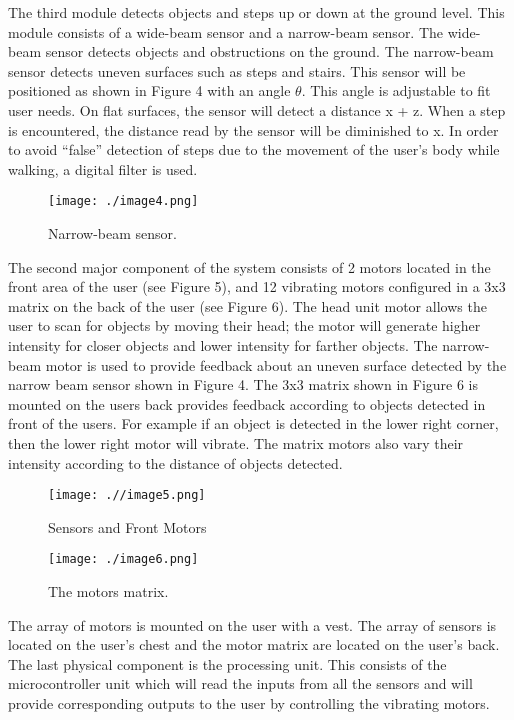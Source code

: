 The third module detects objects and steps up or down at the ground
level. This module consists of a wide-beam sensor and a narrow-beam
sensor. The wide-beam sensor detects objects and obstructions on the
ground. The narrow-beam sensor detects uneven surfaces such as steps and
stairs. This sensor will be positioned as shown in Figure 4 with an
angle $\theta$. This angle is adjustable to fit user needs. On flat surfaces,
the sensor will detect a distance x + z. When a step is encountered, the
distance read by the sensor will be diminished to x. In order to avoid
``false'' detection of steps due to the movement of the user's body
while walking, a digital filter is used.

\begin{figure}
\texttt{[image: ./image4.png]}
\caption{Narrow-beam sensor.}
\label{figure:caseStudyNarrowBeam}
\end{figure}


The second major component of the system consists of 2 motors located in
the front area of the user (see Figure 5), and 12 vibrating motors
configured in a 3x3 matrix on the back of the user (see Figure 6). The
head unit motor allows the user to scan for objects by moving their
head; the motor will generate higher intensity for closer objects and
lower intensity for farther objects. The narrow-beam motor is used to
provide feedback about an uneven surface detected by the narrow beam
sensor shown in Figure 4. The 3x3 matrix shown in Figure 6 is mounted on
the users back provides feedback according to objects detected in front
of the users. For example if an object is detected in the lower right
corner, then the lower right motor will vibrate. The matrix motors also
vary their intensity according to the distance of objects detected.

\begin{figure}
\texttt{[image: .//image5.png]}
\caption{Sensors and Front Motors}
\label{figure:caseStudySensorMotors}
\end{figure}


\begin{figure}
\texttt{[image: ./image6.png]}
\caption{The motors matrix.}
\label{figure:caseStudyMotorMatrix}
\end{figure}

The array of motors is mounted on the user with a vest. The array of
sensors is located on the user's chest and the motor matrix are located
on the user's back. The last physical component is the processing unit.
This consists of the microcontroller unit which will read the inputs
from all the sensors and will provide corresponding outputs to the user
by controlling the vibrating motors.



